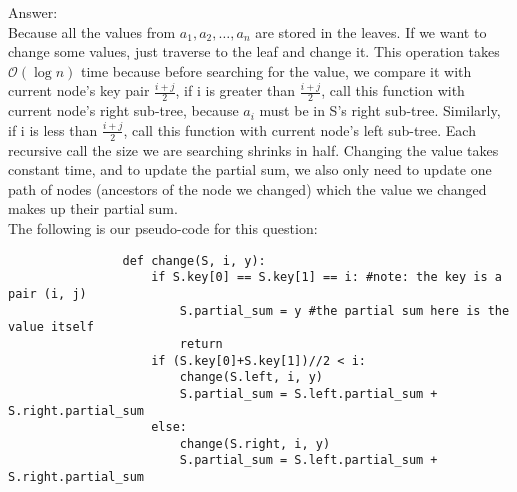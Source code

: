 \documentclass{assignment-263}
\begin{document}
\begin{enumerate}
\begin{enumerate}
				Answer:\\
				Because all the values from $a_1, a_2, \dots, a_n$ are stored in the leaves. If we want to change some values, just traverse to the leaf and change it. This operation takes $\mathcal{O}(\log n)$ time because before searching for the value, we compare it with current node's key pair $\frac{i+j}{2}$, if i is greater than $\frac{i+j}{2}$, call this function with current node's right sub-tree, because $a_i$ must be in S's right sub-tree. Similarly, if i is less than $\frac{i+j}{2}$, call this function with current node's left sub-tree. Each recursive call the size we are searching shrinks in half. Changing the value takes constant time, and to update the partial sum, we also only need to update one path of nodes (ancestors of the node we changed) which the value we changed makes up their partial sum. \\
				The following is our pseudo-code for this question:
				\begin{verbatim}
				def change(S, i, y):
                    if S.key[0] == S.key[1] == i: #note: the key is a pair (i, j)
                        S.partial_sum = y #the partial sum here is the value itself
                        return
                    if (S.key[0]+S.key[1])//2 < i:
                        change(S.left, i, y)
                        S.partial_sum = S.left.partial_sum + S.right.partial_sum
                    else:
                        change(S.right, i, y)
                        S.partial_sum = S.left.partial_sum + S.right.partial_sum
                    
				\end{verbatim}
				
		\end{enumerate}


\end{enumerate}

\program
\end{document}
